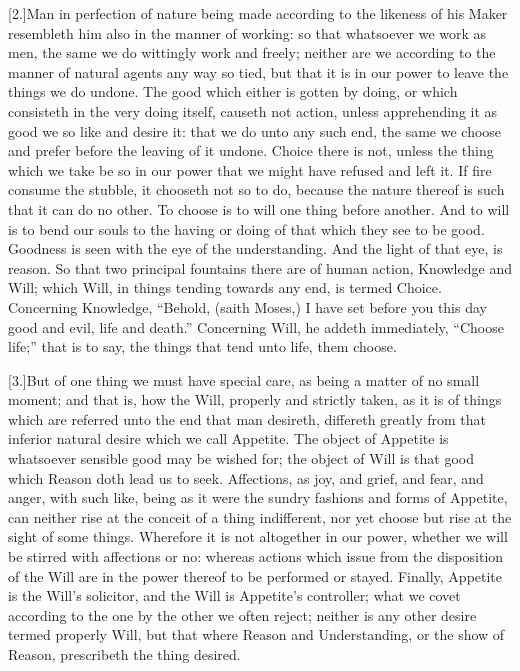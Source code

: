 [2.]Man in perfection of nature being made according to the likeness of his Maker resembleth him also in the manner of working: so that whatsoever we work as men, the same we do wittingly work and freely; neither are we according to the manner of natural agents any way so tied, but that it is in our power to leave the things we do undone. The good which either is gotten by doing, or which consisteth in the very doing itself, causeth not action, unless apprehending it as good we so like and desire it: that we do unto any such end, the same we choose and prefer before the leaving of it undone. Choice there is not, unless the thing which we take be so in our power that we might have refused and left it. If fire consume the stubble, it chooseth not so to do, because the nature thereof is such that it can do no other. To choose is to will one thing before another. And to will is to bend our souls to the having or doing of that which they see to be good. Goodness is seen with the eye of the understanding. And the light of that eye, is reason. So that two principal fountains there are of human action, Knowledge and Will; which Will, in things tending towards any end, is termed Choice. Concerning Knowledge, “Behold, (saith Moses,) I have set before you this day good and evil, life and death.” Concerning Will, he addeth  immediately, “Choose life;” that is to say, the things that tend unto life, them choose.

[3.]But of one thing we must have special care, as being a matter of no small moment; and that is, how the Will, properly and strictly taken, as it is of things which are referred unto the end that man desireth, differeth greatly from that inferior natural desire which we call Appetite. The object of Appetite is whatsoever sensible good may be wished for; the object of Will is that good which Reason doth lead us to seek. Affections, as joy, and grief, and fear, and anger, with such like, being as it were the sundry fashions and forms of Appetite, can neither rise at the conceit of a thing indifferent, nor yet choose but rise at the sight of some things. Wherefore it is not altogether in our power, whether we will be stirred with affections or no: whereas actions which issue from the disposition of the Will are in the power thereof to be performed or stayed. Finally, Appetite is the Will’s solicitor, and the Will is Appetite’s controller; what we covet according to the one by the other we often reject; neither is any other desire termed properly Will, but that where Reason and Understanding, or the show of Reason, prescribeth the thing desired.

